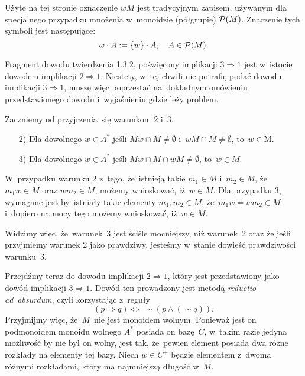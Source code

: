 \documentclass[a4paper,11pt]{article}
\begin{document}
\vspace{\spaceFour}





\start {} Użyte na tej stronie oznaczenie $w M$ jest tradycyjnym
zapisem, używanym dla specjalnego przypadku mnożenia w~monoidzie (półgrupie)
$\mathcal{P}( M )$. Znaczenie tych symboli jest następujące:
\begin{equation}
  \label{eq:Forys-Forys-70}
  w \cdot A := \{ w \} \cdot A, \quad
  A \in \mathcal{P}( M ).
\end{equation}

\vspace{\spaceFour}





\start {} Fragment dowodu twierdzenia 1.3.2, poświęcony implikacji
$3 \Rightarrow 1$ jest w~istocie dowodem implikacji $2 \Rightarrow 1$. Niestety, w~tej chwili
nie potrafię podać dowodu implikacji $3 \Rightarrow 1$, muszę więc poprzestać
na~dokładnym omówieniu przedstawionego dowodu i~wyjaśnieniu gdzie leży
problem.

Zaczniemy od przyjrzenia~się warunkom 2 i~3.
\begin{itemize}

\item[2)] Dla dowolnego $w \in A^{ * }$ jeśli $M w \cap M \neq \emptyset$
  i~$w M \cap M \neq \emptyset$, to~$w \in $M.

\item[3)] Dla dowolnego $w \in A^{ * }$ jeśli $M w \cap M \cap w M \neq \emptyset$,
  to~$w \in M$.

\end{itemize}
W~przypadku warunku 2 z~tego, że~istnieją takie $m_{ 1 } \in M$
i~$m_{ 2 } \in M$, że~$m_{ 1 } w \in M$ oraz $w m_{ 2 } \in M$, możemy wnioskować,
iż~$w \in M$. Dla przypadku 3, wymagane jest by~istniały takie elementy
$m_{ 1 }, m_{ 2 } \in M$, że~$m_{ 1 } w = w m_{ 2 } \in M$ i~dopiero na mocy tego
możemy wnioskować, iż~$w \in M$.

Widzimy więc, że~warunek~3 jest ściśle mocniejszy, niż warunek~2 oraz że
jeśli przyjmiemy warunek 2 jako prawdziwy, jesteśmy w~stanie dowieść
prawdziwości warunku~3.

Przejdźmy teraz do dowodu implikacji $2 \Rightarrow 1$, który jest przedstawiony
jako dowód implikacji $3 \Rightarrow 1$. Dowód ten prowadzony jest metodą
\textit{reductio ad~absurdum}, czyli korzystając z~reguły
\begin{equation}
  \label{eq:Forys-Forys-71}
  ( p \Rightarrow q ) \Leftrightarrow \; \sim ( p \wedge ( \sim q ) ).
\end{equation}
Przyjmijmy więc, że~$M$~nie jest monoidem wolnym. Ponieważ jest on
podmonoidem monoidu wolnego $A^{ * }$ posiada on bazę~$C$, w~takim razie
jedyna możliwość by nie był on wolny, jest tak, że~pewien element posiada
dwa różne rozkłady na elementy tej bazy. Niech $w \in C^{ + }$ będzie
elementem z~dwoma różnymi rozkładami, który ma najmniejszą długość w~$M$.
\end{document}
